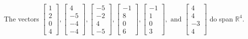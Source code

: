 \begin{exercise}
\begin{exerciseStatement}
  \end{exerciseStatement}
  \begin{exerciseAnswer}
   The vectors \(\left[\begin{array}{r}
1 \\
2 \\
0 \\
4
\end{array}\right] , \left[\begin{array}{r}
4 \\
-5 \\
-4 \\
-4
\end{array}\right] , \left[\begin{array}{r}
-5 \\
-2 \\
4 \\
-5
\end{array}\right] , \left[\begin{array}{r}
-1 \\
8 \\
0 \\
6
\end{array}\right] , \left[\begin{array}{r}
-1 \\
1 \\
0 \\
3
\end{array}\right] , \text{ and } \left[\begin{array}{r}
4 \\
4 \\
-3 \\
4
\end{array}\right]\) 
  	 do  
	span \(\mathbb{R}^4\).
  


  \end{exerciseAnswer}
\end{exercise}